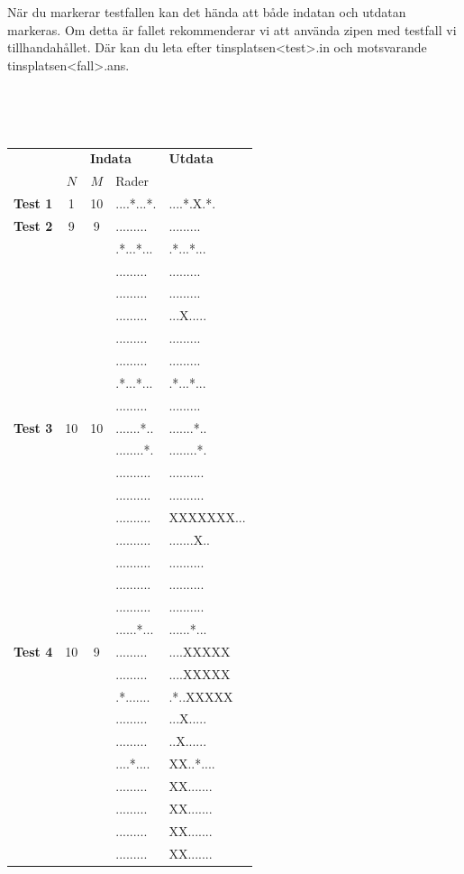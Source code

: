 \documentclass[a4paper,12pt,oneside]{amsbook}
\theoremstyle{test}
\newcommand{\fe}[1]{\textbf{#1}}            %
\begin{document}
När du markerar testfallen kan det hända att både indatan och utdatan markeras. Om detta är fallet rekommenderar vi
att använda zipen med testfall vi tillhandahållet. Där kan du leta efter tinsplatsen<test>.in och motsvarande tinsplatsen<fall>.ans.

~\\
{\tt
\begin{tabular}{||l||c|c|l||l||}\hline\hline
& \multicolumn{3}{c||}{\fe{Indata}} & \fe{Utdata} \\
& $N$ & $M$ & Rader & \\ \hline \hline
\fe{Test 1} &1&10&....*...*. & ....*.X.*. \\
\hline
\fe{Test 2} &9&9&......... & ......... \\
&&&.*...*...&.*...*...\\
&&&.........&.........\\
&&&.........&.........\\
&&&.........&...X.....\\
&&&.........&.........\\
&&&.........&.........\\
&&&.*...*...&.*...*...\\
&&&.........&.........\\
\hline
\fe{Test 3} &10&10&.......*.. & .......*.. \\
&&&........*.&........*.\\
&&&..........&..........\\
&&&..........&..........\\
&&&..........&XXXXXXX...\\
&&&..........&.......X..\\
&&&..........&..........\\
&&&..........&..........\\
&&&..........&..........\\
&&&......*...&......*...\\
\hline
\fe{Test 4} &10&9&......... & ....XXXXX \\
&&&.........&....XXXXX\\
&&&.*.......&.*..XXXXX\\
&&&.........&...X.....\\
&&&.........&..X......\\
&&&....*....&XX..*....\\
&&&.........&XX.......\\
&&&.........&XX.......\\
&&&.........&XX.......\\
&&&.........&XX.......\\

\end{tabular}}
\end{document}
